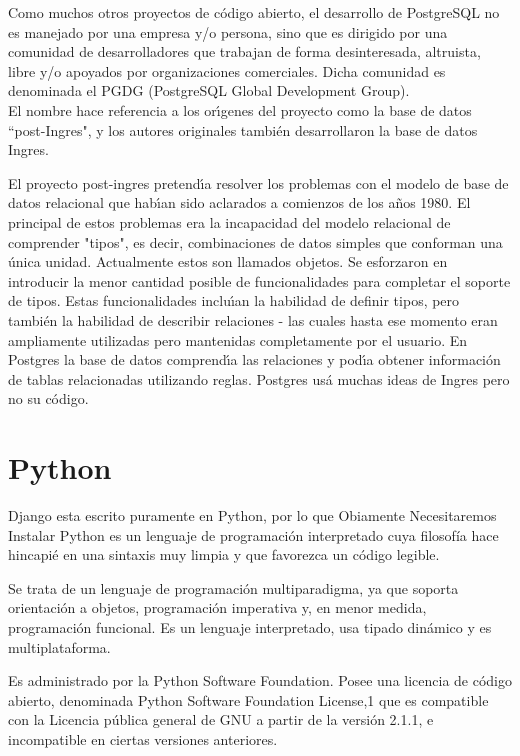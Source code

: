 Como muchos otros proyectos de c\'odigo abierto, el desarrollo de PostgreSQL
no es manejado por una empresa y/o persona, sino que es dirigido por una comunidad
de desarrolladores que trabajan de forma desinteresada, altruista, libre y/o
apoyados por organizaciones comerciales. Dicha comunidad es denominada
el PGDG (PostgreSQL Global Development Group).\\[0.1cm]


El nombre hace referencia a los or\'{\i}genes del proyecto como la base de datos
``post-Ingres", y los autores originales tambi\'en desarrollaron la base de datos 
Ingres.

El proyecto post-ingres pretend\'{\i}a resolver los problemas con el modelo de base
de datos relacional que hab\'{\i}an sido aclarados a comienzos de los a\~nos 1980. El
principal de estos problemas era la incapacidad del modelo relacional de
comprender "tipos", es decir, combinaciones de datos simples que conforman una
\'unica unidad. Actualmente estos son llamados objetos. Se esforzaron en introducir
la menor cantidad posible de funcionalidades para completar el soporte de tipos.
Estas funcionalidades inclu\'{\i}an la habilidad de definir tipos, pero tambi\'en
la habilidad de describir relaciones - las cuales hasta ese momento eran
ampliamente utilizadas pero mantenidas completamente por el usuario. En Postgres
la base de datos comprend\'{\i}a las relaciones y pod\'{\i}a obtener informaci\'on 
de tablas relacionadas utilizando reglas. Postgres us\'a muchas ideas de Ingres
pero no su c\'odigo.


\section{Python}

Django esta escrito puramente en Python, por lo que Obiamente Necesitaremos Instalar
 Python es un lenguaje de programación interpretado cuya filosofía hace
 hincapié en una sintaxis muy limpia y que favorezca un código legible.
 
Se trata de un lenguaje de programación multiparadigma, ya que soporta
orientación a objetos, programación imperativa y, en menor medida, programación
funcional. Es un lenguaje interpretado, usa tipado dinámico y es multiplataforma.

Es administrado por la Python Software Foundation. Posee una licencia de código
abierto, denominada Python Software Foundation License,1 que es compatible con
la Licencia pública general de GNU a partir de la versión 2.1.1, e
incompatible en ciertas versiones anteriores.

